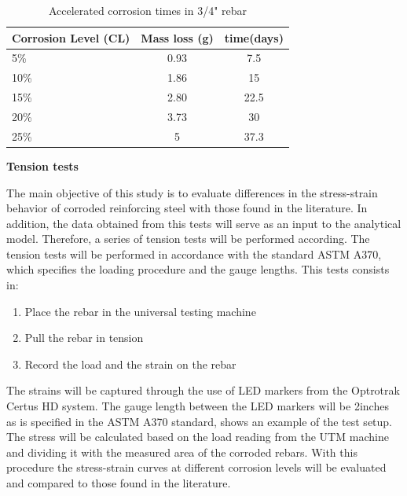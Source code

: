 \begin{table}[htbp]
	\caption{Accelerated corrosion times in 3/4" rebar}
	\label{tab:AcceleratedCorrosionTime}
	\centering	
		\begin{tabular}{|l|c|c|}
		\hline
		Corrosion Level (CL) & Mass loss (g)   & time(days)     \\  \hline	
		5\%                  & 0.93            & 7.5    \\  \hline	
		10\%                 & 1.86            & 15     \\  \hline	
		15\%                 & 2.80            & 22.5   \\  \hline	
		20\%                 & 3.73            & 30     \\  \hline	
		25\%                 & 5               & 37.3   \\  \hline	
		\end{tabular}
\end{table}
\newpage

\textbf{Tension tests}

The main objective of this study is to evaluate differences in the stress-strain behavior of corroded reinforcing steel with those found in the literature. In addition, the data obtained from this tests will serve as an input to the analytical model. Therefore, a series of tension tests will be performed according. The tension tests will be performed in accordance with the standard ASTM A370, which specifies the loading procedure and the gauge lengths. This tests consists in:
\begin{enumerate}
    \item Place the rebar in the universal testing machine
    \item Pull the rebar in tension 
    \item Record the load and the strain on the rebar 
\end{enumerate}

The strains will be captured through the use of LED markers from the Optrotrak Certus HD system. The gauge length between the LED markers will be 2inches as is specified in the ASTM A370 standard,  shows an example of the test setup. The stress will be calculated based on the load reading from the UTM machine and dividing it with the measured area of the corroded rebars. With this procedure the stress-strain curves at different corrosion levels will be evaluated and compared to those found in the literature.

